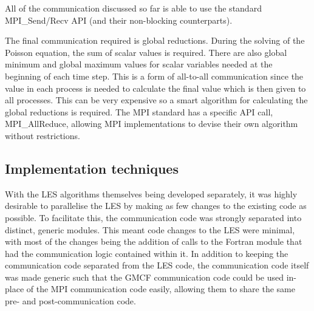 All of the communication discussed so far is able to use the standard
MPI\_Send/Recv API (and their non-blocking counterparts).

The final communication required is global reductions. During the solving of the
Poisson equation, the sum of scalar values is required. There are also global
minimum and global maximum values for scalar variables needed at the beginning
of each time step. This is a form of all-to-all communication since the value in
each process is needed to calculate the final value which is then given to all
processes. This can be very expensive so a smart algorithm for calculating the
global reductions is required. The MPI standard has a specific API call,
MPI\_AllReduce, allowing MPI implementations to devise their own algorithm
without restrictions.

\subsection{Implementation techniques}

With the LES algorithms themselves being developed separately, it was highly
desirable to parallelise the LES by making as few changes to the existing code
as possible. To facilitate this, the communication code was strongly separated
into distinct, generic modules. This meant code changes to the LES were minimal,
with most of the changes being the addition of calls to the Fortran module that
had the communication logic contained within it. In addition to keeping the
communication code separated from the LES code, the communication code itself
was made generic such that the GMCF communication code could be used in-place of
the MPI communication code easily, allowing them to share the same pre- and
post-communication code.
